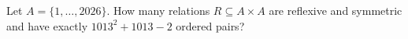 Let $A=\{1,\ldots,2026\}$. How many relations $R\subseteq A\times A$ are reflexive and symmetric and have exactly $1013^2+1013-2$ ordered pairs?
